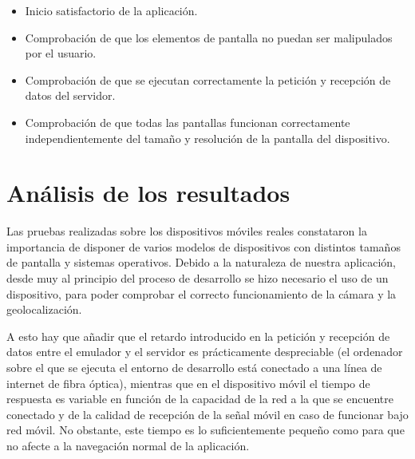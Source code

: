 \begin{itemize}
	\item Inicio satisfactorio de la aplicación.
	\item Comprobación de que los elementos de pantalla no puedan ser malipulados por el usuario.
	\item Comprobación de que se ejecutan correctamente la petición y recepción de datos del servidor.
	\item Comprobación de que todas las pantallas funcionan correctamente independientemente del tamaño y resolución de la pantalla del dispositivo.
\end{itemize}

\section{Análisis de los resultados}
Las pruebas realizadas sobre los dispositivos móviles reales constataron la importancia de disponer de varios modelos de dispositivos con distintos tamaños de pantalla y sistemas operativos. Debido a la naturaleza de nuestra aplicación, desde muy al principio del proceso de desarrollo se hizo necesario el uso de un dispositivo, para poder comprobar el correcto funcionamiento de la cámara y la geolocalización.

A esto hay que añadir que el retardo introducido en la petición y recepción de datos entre el emulador y el servidor es prácticamente despreciable (el ordenador sobre el que se ejecuta el entorno de desarrollo está conectado a una línea de internet de fibra óptica), mientras que en el dispositivo móvil el tiempo de respuesta es variable en función de la capacidad de la red a la que se encuentre conectado y de la calidad de recepción de la señal móvil en caso de funcionar bajo red móvil. No obstante, este tiempo es lo suficientemente pequeño como para que no afecte a la navegación normal de la aplicación.

\chapterend